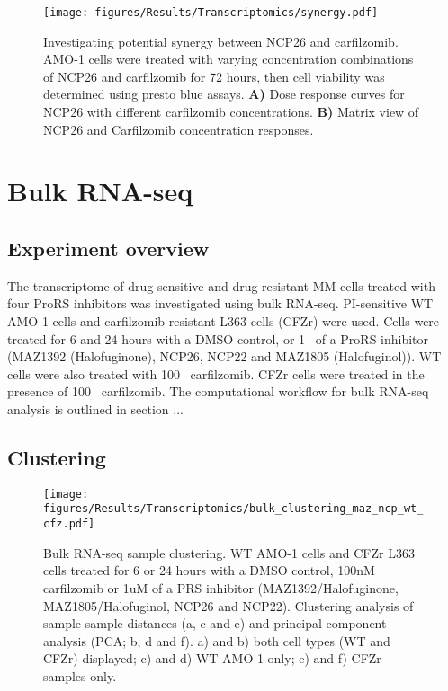 \begin{figure}[h]
\centering
\texttt{[image: figures/Results/Transcriptomics/synergy.pdf]}
\caption[NCP26 and carfilzomib synergism]{Investigating potential synergy between NCP26 and carfilzomib.
AMO-1 cells were treated with varying concentration combinations of NCP26 and carfilzomib for 72 hours, then cell viability was determined using presto blue assays.
\textbf{A)} Dose response curves for NCP26 with different carfilzomib concentrations.
\textbf{B)} Matrix view of NCP26 and Carfilzomib concentration responses.
}
\label{fig:synergy}\end{figure}

\clearpage

\section{Bulk RNA-seq}

\subsection{Experiment overview}
The transcriptome of drug-sensitive and drug-resistant MM cells treated with four ProRS inhibitors was investigated using bulk RNA-seq.
PI-sensitive WT AMO-1 cells and carfilzomib resistant L363 cells (CFZr) were used.
Cells were treated for 6 and 24 hours with a DMSO control, or 1\si{\micro\Molar} of a ProRS inhibitor (MAZ1392 (Halofuginone), NCP26, NCP22 and MAZ1805 (Halofuginol)).
WT cells were also treated with 100\si{\nano\Molar} carfilzomib.
CFZr cells were treated in the presence of 100\si{\nano\Molar} carfilzomib.
The computational workflow for bulk RNA-seq analysis is outlined in section ...

\subsection{Clustering}

\begin{figure}[p]
\centering
\texttt{[image: figures/Results/Transcriptomics/bulk\_clustering\_maz\_ncp\_wt\_cfz.pdf]}
\caption[Bulk RNA-seq sample clustering]{Bulk RNA-seq sample clustering.
WT AMO-1 cells and CFZr L363 cells treated for 6 or 24 hours with a DMSO control, 100nM carfilzomib or 1uM of a PRS inhibitor (MAZ1392/Halofuginone, MAZ1805/Halofuginol, NCP26 and NCP22).
Clustering analysis of sample-sample distances (a, c and e) and principal component analysis (PCA; b, d and f).
a) and b) both cell types (WT and CFZr) displayed; c) and d) WT AMO-1 only; e) and f) CFZr samples only.
}
\label{fig:clustering_bulk}\end{figure}


